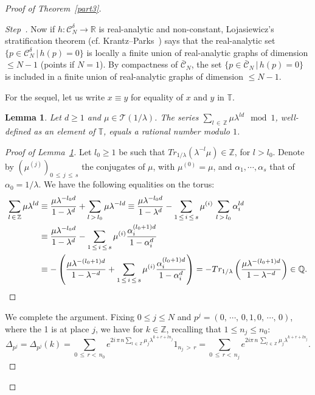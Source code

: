 \documentclass[10pt]{amsart}
\newtheorem{lemm}[theo]{Lemma}\newtheorem{prop}[theo]{Proposition}\newtheorem{coro}[theo]{Corollary}\newtheorem{conj}[theo]{Conjecture}
\theoremstyle{definition}\newtheorem{defi}[theo]{Definition}\newtheorem{rema}[theo]{Remark}\newtheorem{exam}[theo]{Example}\newtheorem{exem}[theo]{Example}\newtheorem{nota}[theo]{Notation}
\newcommand{\Tbb}{\mathbb T}
\newcommand{\Rbb}{\mathbb R}
\newcommand{\Qbb}{\mathbb Q}
\newcommand{\Zbb}{\mathbb Z}
\newcommand{\Ccl}{\mathcal{C}}
\newcommand{\Tcl}{\mathcal{T}}
\newcounter{stepcount}
\newenvironment{step}{\refstepcounter{stepcount}\begin{proof}[Step~\thestepcount]}{\let\qed\relax\end{proof}}
\begin{document}
\begin{proof}[{Proof of Theorem~\ref{part3}}]
\begin{step}
Now if $h:{\Ccl}^{\delta}_N\rightarrow\Rbb$ is real-analytic and non-constant, Lojasiewicz's stratification theorem (cf. Krantz--Parks~\cite[Theorem~5.2.3]{krantzpark}) says that the real-analytic set $\{p\in{\Ccl}^{\delta}_N\,|\,h(p)=0\}$ is locally a finite union of real-analytic graphs of dimension $\leq N-1$ (points if $N=1$). By compactness of $\bar{\Ccl}_N$, the set $\{p\in\bar{\Ccl}_N\,|\,h(p)=0\}$ is included in a finite union of real-analytic graphs of dimension $\leq N-1$.



For the sequel, let us write $x\equiv y$ for equality of $x$ and $y$ in $\Tbb$.

\begin{lemm}\label{lemm5.2}
Let $d\geq1$ and $\mu\in{\Tcl}(1/\lambda)$. The series $\sum_{l\,\in\,\Zbb}\mu\lambda^{ld}\mod1$, well-defined as an element of $\Tbb$, equals a rational number modulo $1$.
\end{lemm}
\pagebreak
\begin{proof}[{Proof of Lemma~\ref{lemm5.2}}]
Let $l_0\geq1$ be such that $Tr_{1/\lambda}(\lambda^{-l}\mu)\in\Zbb$, for $l>l_0$. Denote by $(\mu^{(j)})_{0\,\leq\,j\,\leq\,s}$ the conjugates of $\mu$, with $\mu^{(0)}=\mu$, and $\alpha_1,\cdots,\alpha_{s}$ that of $\alpha_0=1/\lambda$. We have the following equalities on the torus:
\begin{align*}
\sum_{l\,\in\,\Zbb}\mu\lambda^{ld}&\equiv\frac{\mu\lambda^{-l_0d}}{1-\lambda^d}+\sum_{l\,>\,l_0}\mu\lambda^{-ld}\equiv\frac{\mu\lambda^{-l_0d}}{1-\lambda^d}-\sum_{1\,\leq\,i\,\leq\,s}\mu^{(i)}\,\sum_{l\,>\,l_0}\alpha_i^{ld}\\
&\equiv\frac{\mu\lambda^{-l_0d}}{1-\lambda^d}-\sum_{1\,\leq\,i\,\leq\,s}\mu^{(i)}\frac{\alpha_i^{(l_0+1)d}}{1-\alpha_i^d}\\
&\equiv-\left({\frac{\mu\lambda^{-(l_0+1)d}}{1-\lambda^{-d}}+\sum_{1\,\leq\,i\,\leq\,s}\mu^{(i)}\frac{\alpha_i^{(l_0+1)d}}{1-\alpha_i^d}}\right)=-Tr_{1/\lambda}\left({\frac{\mu\lambda^{-(l_0+1)d}}{1-\lambda^{-d}}}\right)\in\Qbb.\qedhere
\end{align*}
\end{proof}



We complete the argument. Fixing $0\leq j\leq N$ and $p^{j}=(0,\,\cdots,\,0,1,0,\,\cdots,\,0)$, where the 1 is at place $j$, we have for $k\in\Zbb$, recalling that $1\leq n_j\leq n_0$:
\[
\Delta_{p^j}=\Delta_{p^j}(k)=\sum_{0\,\leq \,r<\, n_0}e^{2i\,\pi\,n\sum_{l\,\in\,\Zbb}\mu_j\lambda^{k+r+ln_j}}1_{n_j\,>\,r}=\sum_{0\,\leq\,r<\,n_j}e^{2i\pi\,n\,\sum_{l\,\in\,\Zbb}\mu_j\lambda^{k+r+ln_j}}.
\]



\end{step}
\end{proof}
\end{document}
